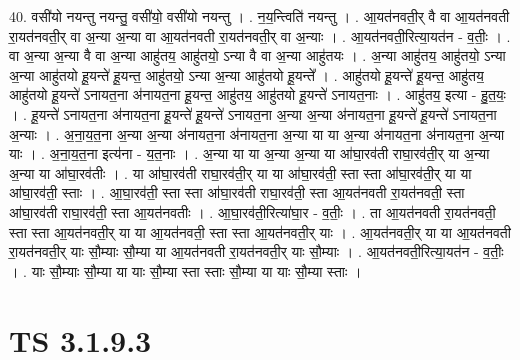 \documentclass[17pt]{extarticle}
\begin{document}
40. वसी॑यो नयन्तु नयन्तु॒ वसी॑यो॒ वसी॑यो नयन्तु । . न॒य॒न्त्विति॑ नयन्तु । . आ॒यत॑नवती॒र् वै वा आ॒यत॑नवती रा॒यत॑नवती॒र् वा अ॒न्या अ॒न्या वा आ॒यत॑नवती रा॒यत॑नवती॒र् वा अ॒न्याः । . आ॒यत॑नवती॒रित्या॒यत॑न - व॒तीः॒ । . वा अ॒न्या अ॒न्या वै वा अ॒न्या आहु॑तय॒ आहु॑तयो॒ ऽन्या वै वा अ॒न्या आहु॑तयः । . अ॒न्या आहु॑तय॒ आहु॑तयो॒ ऽन्या अ॒न्या आहु॑तयो हू॒यन्ते॑ हू॒यन्त॒ आहु॑तयो॒ ऽन्या अ॒न्या आहु॑तयो हू॒यन्ते᳚ । . आहु॑तयो हू॒यन्ते॑ हू॒यन्त॒ आहु॑तय॒ आहु॑तयो हू॒यन्ते॑ ऽनायत॒ना अ॑नायत॒ना हू॒यन्त॒ आहु॑तय॒ आहु॑तयो हू॒यन्ते॑ ऽनायत॒नाः । . आहु॑तय॒ इत्या - हु॒त॒यः॒ । . हू॒यन्ते॑ ऽनायत॒ना अ॑नायत॒ना हू॒यन्ते॑ हू॒यन्ते॑ ऽनायत॒ना अ॒न्या अ॒न्या अ॑नायत॒ना हू॒यन्ते॑ हू॒यन्ते॑ ऽनायत॒ना अ॒न्याः । . अ॒ना॒य॒त॒ना अ॒न्या अ॒न्या अ॑नायत॒ना अ॑नायत॒ना अ॒न्या या या अ॒न्या अ॑नायत॒ना अ॑नायत॒ना अ॒न्या याः । . अ॒ना॒य॒त॒ना इत्य॑ना - य॒त॒नाः । . अ॒न्या या या अ॒न्या अ॒न्या या आ॑घा॒रव॑ती राघा॒रव॑ती॒र् या अ॒न्या अ॒न्या या आ॑घा॒रव॑तीः । . या आ॑घा॒रव॑ती राघा॒रव॑ती॒र् या या आ॑घा॒रव॑ती॒ स्ता स्ता आ॑घा॒रव॑ती॒र् या या आ॑घा॒रव॑ती॒ स्ताः । . आ॒घा॒रव॑ती॒ स्ता स्ता आ॑घा॒रव॑ती राघा॒रव॑ती॒ स्ता आ॒यत॑नवती रा॒यत॑नवती॒ स्ता आ॑घा॒रव॑ती राघा॒रव॑ती॒ स्ता आ॒यत॑नवतीः । . आ॒घा॒रव॑ती॒रित्या॑घा॒र - व॒तीः॒ । . ता आ॒यत॑नवती रा॒यत॑नवती॒ स्ता स्ता आ॒यत॑नवती॒र् या या आ॒यत॑नवती॒ स्ता स्ता आ॒यत॑नवती॒र् याः । . आ॒यत॑नवती॒र् या या आ॒यत॑नवती रा॒यत॑नवती॒र् याः सौ॒म्याः सौ॒म्या या आ॒यत॑नवती रा॒यत॑नवती॒र् याः सौ॒म्याः । . आ॒यत॑नवती॒रित्या॒यत॑न - व॒तीः॒ । . याः सौ॒म्याः सौ॒म्या या याः सौ॒म्या स्ता स्ताः सौ॒म्या या याः सौ॒म्या स्ताः । \newline
\pagebreak
{}

\section{ TS 3.1.9.3 }
\end{document}
